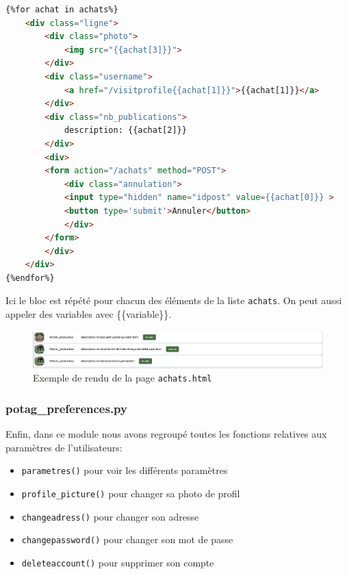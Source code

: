 \documentclass[11pt]{article}
\begin{document}
\begin{lstlisting}[language=html, caption={Boucle dans le code html de \texttt{achats.html}}]
{%for achat in achats%}
    <div class="ligne">
        <div class="photo">
            <img src="{{achat[3]}}">
        </div>
        <div class="username">
            <a href="/visitprofile{{achat[1]}}">{{achat[1]}}</a>
        </div>
        <div class="nb_publications">
            description: {{achat[2]}}
        </div>
        <div>
        <form action="/achats" method="POST">
            <div class="annulation">
            <input type="hidden" name="idpost" value={{achat[0]}} >
            <button type='submit'>Annuler</button>
            </div>
        </form>
        </div>
    </div>
{%endfor%}
\end{lstlisting}
Ici le bloc est répété pour chacun des éléments de la liste \texttt{achats}. On peut aussi appeler des variables avec \{\{variable\}\}.

\begin{figure}[h]
    \centering
    \includegraphics[scale=0.35]{ScreenAchats.png}
    \caption{Exemple de rendu de la page \texttt{achats.html}}
\end{figure}

\subsubsection{potag\_preferences.py}

Enfin, dans ce module nous avons regroupé toutes les fonctions relatives aux paramètres de l'utilisateurs:

\begin{itemize}
    \item \texttt{parametres()} pour voir les différents paramètres
    \item \texttt{profile\_picture()} pour changer sa photo de profil   
    \item \texttt{changeadress()} pour changer son adresse
    \item \texttt{changepassword()} pour changer son mot de passe
    \item \texttt{deleteaccount()} pour supprimer son compte
\end{itemize}
\vspace{0.4cm}
\end{document}
